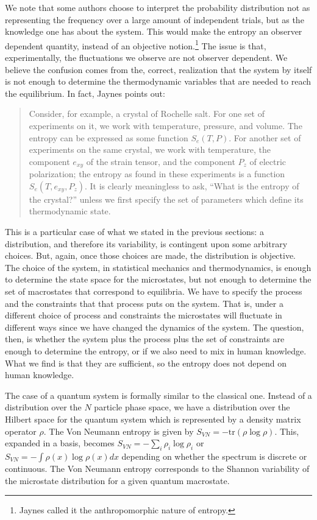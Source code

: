 \documentclass{article}
\begin{document}
We note that some authors choose to interpret the probability distribution not as representing the frequency over a large amount of independent trials, but as the knowledge one has about the system. This would make the entropy an observer dependent quantity, instead of an objective notion.\footnote{Jaynes called it the anthropomorphic nature of entropy.} The issue is that, experimentally, the fluctuations we observe are not observer dependent. We believe the confusion comes from the, correct, realization that the system by itself is not enough to determine the thermodynamic variables that are needed to reach the equilibrium. In fact, Jaynes points out:
\begin{quote}
Consider, for example, a crystal of Rochelle salt. For one set of experiments on it, we work with temperature, pressure, and volume. The entropy can be expressed as some function $S_e(T,P)$. For another set of experiments on the same crystal, we work with temperature, the component $e_{xy}$ of the strain tensor, and the component $P_z$ of electric polarization; the entropy as found in these experiments is a function $S_e(T,e_{xy},P_z)$. It is clearly  meaningless to ask, ``What is the entropy of the crystal?''  unless we first specify the set of parameters which define its thermodynamic state.
\end{quote}
This is a particular case of what we stated in the previous sections: a distribution, and therefore its variability, is contingent upon some arbitrary choices. But, again, once those choices are made, the distribution is objective. The choice of the system, in statistical mechanics and thermodynamics, is enough to determine the state space for the microstates, but not enough to determine the set of macrostates that correspond to equilibria. We have to specify the process and the constraints that that process puts on the system. That is, under a different choice of process and constraints the microstates will fluctuate in different ways since we have changed the dynamics of the system. The question, then, is whether the system plus the process plus the set of constraints are enough to determine the entropy, or if we also need to mix in human knowledge. What we find is that they are sufficient, so the entropy does not depend on human knowledge.

The case of a quantum system is formally similar to the classical one. Instead of a distribution over the $N$ particle phase space, we have a distribution over the Hilbert space for the quantum system which is represented by a density matrix operator $\rho$. The Von Neumann entropy is given by $S_{VN} = - \textrm{tr}(\rho \log \rho)$. This, expanded in a basis, becomes $S_{VN} = - \sum_i \rho_i \log \rho_i$ or $S_{VN} = - \int \rho(x) \log \rho(x)dx$ depending on whether the spectrum is discrete or continuous.  The Von Neumann entropy corresponds to the Shannon variability of the microstate distribution for a given quantum macrostate.
\end{document}
